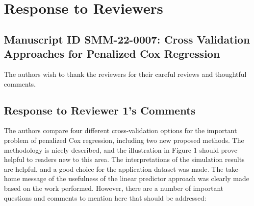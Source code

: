 \documentclass[12]{article}
\begin{document}
\section*{Response to Reviewers}
\subsection*{Manuscript ID SMM-22-0007: Cross Validation Approaches for
Penalized Cox Regression}

The authors wish to thank the reviewers for their careful reviews and thoughtful comments.

\subsection*{Response to Reviewer 1's Comments}

The authors compare four different cross-validation options for the important problem of penalized Cox regression, including two new proposed methods. The methodology is nicely described, and the illustration in Figure 1 should prove helpful to readers new to this area. The interpretations of the simulation results are helpful, and a good choice for the application dataset was made. The take-home message of the usefulness of the linear predictor approach was clearly made based on the work performed. However, there are a number of important questions and comments to mention here that should be addressed:
\end{document}
